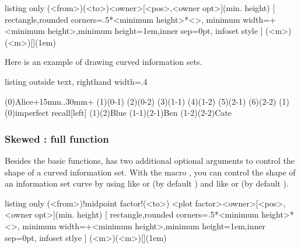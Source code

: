 \begin{tcblisting}{listing only}
  (<from>)(<to>){<owner>}[<pos>,<owner opt>](min. height)
  [ rectangle,rounded corners=.5*<minimum height>*<\xtscale>,
    minimum width=+<minimum height>,minimum height=1em,inner sep=0pt,
    infoset style ] %
  (<m>)(<m>){}[](1em)
\end{tcblisting}

Here is an example of drawing curved information sets.

\begin{tcblisting}{listing outside text, righthand width=.4\linewidth}
\begin{istgame}
\istroot(0){Alice}+15mm..30mm+
  \istb \istb \endist
\istroot(1)(0-1)  \istb \istb \endist
\istroot(2)(0-2)  \istb \istb \endist
\xtdistance{10mm}{10mm}
\istroot(3)(1-1)  \istb \istb \endist
\istroot(4)(1-2)  \istb \istb \endist
\istroot(5)(2-1)  \istb \istb \endist
\istroot(6)(2-2)  \istb \istb \endist
\xtCInfoset(1)(0){imperfect recall}[left]
(1)(2){Blue}
\xtCInfoset(1-1)(2-1){Ben}
\xtCInfoset(1-2)(2-2){Cate}
\end{istgame}
\end{tcblisting}


\subsubsection{Skewed \protect\cmd{\xtCInfoset}: full function}

Besides the basic functions, \cmd{\xtCInfoset} has two additional optional arguments to control the shape of a curved information set.
With the macro \cmd{\xtCInfoset}, you can control the shape of an information set curve by using  like  or  (by default ) and  like  or  (by default ).

\begin{tcblisting}{listing only}
  (<from>)!midpoint factor!(<to>)
             <plot factor>{<owner>}[<pos>,<owner opt>](min. height)
  [ rectangle,rounded corners=.5*<minimum height>*<\xtscale>,
    minimum width=+<minimum height>,minimum height=1em,inner sep=0pt,
    infoset stlye ]   %
  (<m>)(<m>){}[](1em)
\end{tcblisting}

